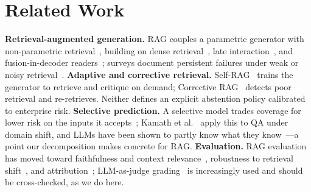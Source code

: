 \documentclass[conference,letterpaper]{IEEEtran}
\begin{document}
\section{Related Work}
\textbf{Retrieval-augmented generation.} RAG couples a parametric generator with non-parametric
retrieval~\cite{lewis2020rag}, building on dense retrieval~\cite{karpukhin2020dpr},
late interaction~\cite{khattab2020colbert}, and fusion-in-decoder
readers~\cite{izacard2021fid}; surveys document persistent failures under weak or noisy
retrieval~\cite{gao2023survey}. \textbf{Adaptive and corrective retrieval.}
Self-RAG~\cite{asai2023selfrag} trains the generator to retrieve and critique on demand;
Corrective RAG~\cite{yan2024crag} detects poor retrieval and re-retrieves. Neither defines an
explicit abstention policy calibrated to enterprise risk. \textbf{Selective prediction.} A
selective model trades coverage for lower risk on the inputs it accepts~\cite{elyaniv2010,geifman2019selectivenet};
Kamath et al.~\cite{kamath2020selective} apply this to QA under domain shift, and LLMs have been
shown to partly know what they know~\cite{kadavath2022know}---a point our decomposition makes
concrete for RAG. \textbf{Evaluation.} RAG evaluation has moved toward faithfulness and context
relevance~\cite{es2023ragas}, robustness to retrieval shift~\cite{thakur2021beir}, and
attribution~\cite{bohnet2022attributed}; LLM-as-judge grading~\cite{zheng2023judge} is
increasingly used and should be cross-checked, as we do here.
\end{document}
